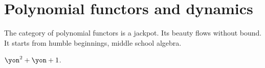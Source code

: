 \documentclass[DynamicalBook]{subfiles}
\begin{document}
%


\setcounter{chapter}{3}%


\chapter{Polynomial functors and dynamics}

The category of polynomial functors is a jackpot. Its beauty flows without bound. It starts from humble beginnings, middle school algebra.

$\yon^2+\yon+1$.
\end{document}
